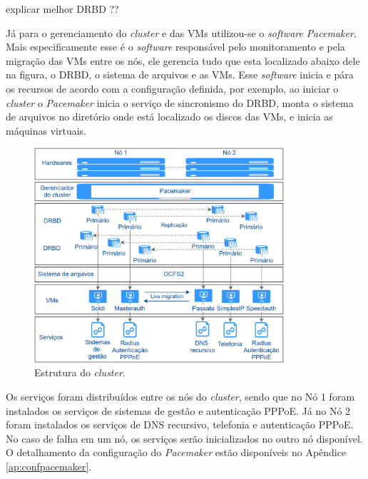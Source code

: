 explicar melhor DRBD ??

Já para o gerenciamento do \textit{cluster} e das \acp{VM} utilizou-se o \textit{software} \textit{Pacemaker}. 
Mais especificamente esse é o \textit{software} responsável pelo monitoramento e pela migração das \acp{VM} entre os nós, ele gerencia
tudo que esta localizado abaixo dele na figura, o \ac{DRBD}, o sistema de arquivos e as \acp{VM}.
Esse \textit{software} inicia e pára os recursos de acordo com a configuração definida, por exemplo, ao iniciar o \textit{cluster} o 
\textit{Pacemaker} inicia o serviço de sincronismo do \ac{DRBD}, monta o sistema de arquivos no diretório onde está localizado os 
discos das \acp{VM}, e inicia as máquinas virtuais.

\begin{figure}[h!]
 \centering
 \includegraphics[width=350px]{img/projeto_estrutura.eps}
 \caption{Estrutura do \textit{cluster}.}
 \label{fig:projeto_estrutura}
\end{figure}

Os serviços foram distribuídos entre os nós do \textit{cluster}, sendo que no Nó 1 foram instalados os serviços de sistemas de gestão e 
autenticação \ac{PPPoE}. Já no Nó 2 foram instalados os serviços de \ac{DNS} recursivo, telefonia e autenticação \ac{PPPoE}.
No caso de falha em um nó, os serviços serão inicializados no outro nó disponível. O detalhamento da configuração do \textit{Pacemaker} 
estão disponíveis no Apêndice \ref{ap:confpacemaker}.



